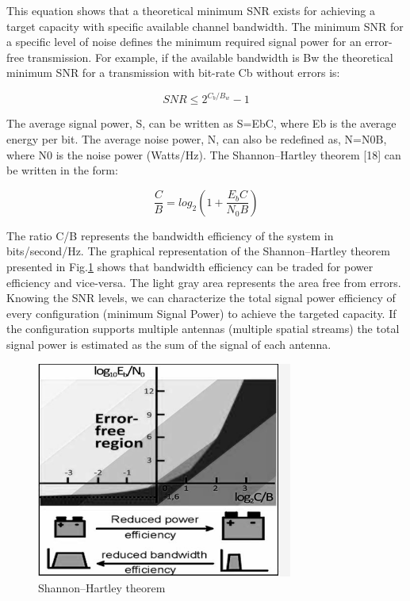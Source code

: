 	This equation shows that a theoretical minimum SNR exists for achieving a target capacity with specific available channel bandwidth. The minimum SNR for a specific level of noise defines the minimum required signal power for an error-free transmission. For example, if the available bandwidth is Bw the theoretical minimum SNR for a transmission with bit-rate Cb without errors is: 

\begin{equation}
SNR \leq 2^{C_{b}/B_{w}} - 1
\end{equation}
	
	The average signal power, S, can be written as S=EbC, where Eb is the average energy per bit. The average noise power, N, can also be redefined as, N=N0B, where N0 is the noise power (Watts/Hz). The Shannon–Hartley theorem [18] can be written in the form:

\begin{equation}
\frac{C}{B} = log_{2}(1 + \frac{E_{b} C}{N_{0} B})
\end{equation}

	The ratio C/B represents the bandwidth efficiency of the system in bits/second/Hz. The graphical representation of the Shannon–Hartley theorem presented in Fig.\ref{fig:F1} shows that bandwidth efficiency can be traded for power efficiency and vice-versa. The light gray area represents the area free from errors. Knowing the SNR levels, we can characterize the total signal power efficiency of every configuration (minimum Signal Power) to achieve the targeted capacity. If the configuration supports multiple antennas (multiple spatial streams) the total signal power is estimated as the sum of the signal of each antenna.
 
 \begin{figure}
\centering
\includegraphics[width=0.75\textwidth]{F/image4.png}
\caption{Shannon–Hartley theorem}
\label{fig:F1}
\end{figure}
 
